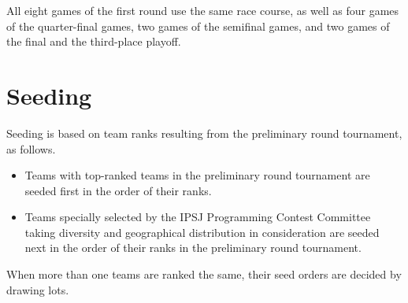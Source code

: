 \documentclass[11pt]{article}
\begin{document}
All eight games of the first round use the same race course,
as well as four games of the quarter-final games,
two games of the semifinal games,
and two games of the final and the third-place playoff.

\section{Seeding}
Seeding is based on team ranks resulting from the preliminary round
tournament, as follows.
\begin{itemize}
\item
  Teams with top-ranked teams in the preliminary round tournament are
  seeded first in the order of their ranks.
\item
  Teams specially selected by the IPSJ Programming Contest Committee
  taking diversity and geographical distribution in consideration are
  seeded next in the order of their ranks in the preliminary round
  tournament.
\end{itemize}
When more than one teams are ranked the same, their seed orders are
decided by drawing lots.
\end{document}
